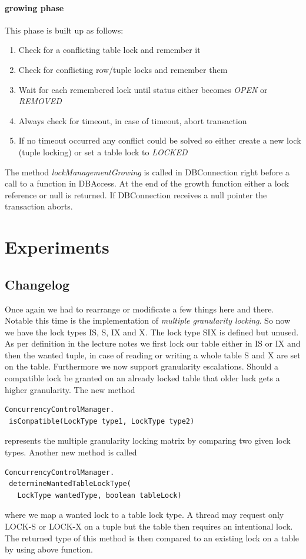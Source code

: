 \documentclass{vldb}
\begin{document}
\begin{itemize}
\paragraph*{growing phase} This phase is built up as follows:
\begin{enumerate}
	\item Check for a conflicting table lock and remember it
	\item Check for conflicting row/tuple locks and remember them
	\item Wait for each remembered lock until status either becomes \textit{OPEN} or \textit{REMOVED}
	\item Always check for timeout, in case of timeout, abort transaction
	\item If no timeout occurred any conflict could be solved so either create a new lock (tuple locking) or set a table lock to \textit{LOCKED}
\end{enumerate}
The method \textit{lockManagementGrowing} is called in DBConnection right before a call to a function in DBAccess. At the end of the growth function either a lock reference or null is returned. If DBConnection receives a null pointer the transaction aborts.
\end{itemize}

\section{Experiments}
\subsection{Changelog}
Once again we had to rearrange or modificate a few things here and there. Notable this time is the implementation of \textit{multiple granularity locking}. So now we have the lock types IS, S, IX and X. The lock type SIX is defined but unused. As per definition in the lecture notes we first lock our table either in IS or IX and then the wanted tuple, in case of reading or writing a whole table S and X are set on the table. Furthermore we now support granularity escalations. Should a compatible lock be granted on an already locked table that older luck gets a higher granularity. The new method
\begin{verbatim}
ConcurrencyControlManager.
 isCompatible(LockType type1, LockType type2)
\end{verbatim}
represents the multiple granularity locking matrix by comparing two given lock types. Another new method is called
\begin{verbatim}
ConcurrencyControlManager.
 determineWantedTableLockType(
   LockType wantedType, boolean tableLock)
\end{verbatim}
where we map a wanted lock to a table lock type. A thread may request only LOCK-S or LOCK-X on a tuple but the table then requires an intentional lock. The returned type of this method is then compared to an existing lock on a table by using above function.
\end{document}
